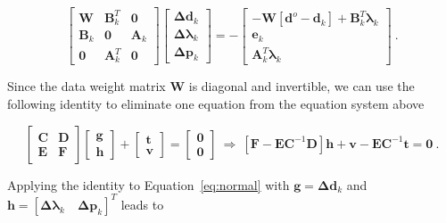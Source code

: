 \begin{equation}
    \begin{bmatrix}
      \mathbf{W} & \mathbf{B}_k^T & \mathbf{0} \\
      \mathbf{B}_k & \mathbf{0} & \mathbf{A}_k \\
      \mathbf{0} & \mathbf{A}_k^T & \mathbf{0}
    \end{bmatrix}
  \begin{bmatrix}
    \mathbf{\Delta d}_k \\
    \boldsymbol{\Delta\lambda}_k \\
    \mathbf{\Delta p}_k
  \end{bmatrix}
  = -
    \begin{bmatrix}
      -\mathbf{W}\left[\mathbf{d}^o - \mathbf{d}_k\right] + \mathbf{B}_k^T\boldsymbol{\lambda}_k
      \\
      \mathbf{e}_k
      \\
      \mathbf{A}_k^T\boldsymbol{\lambda}_k
    \end{bmatrix}
  \ .
  \label{eq:normal}
\end{equation}

Since the data weight matrix $\mathbf{W}$ is diagonal and invertible, we can
use the following identity to eliminate one equation from the equation system
above \citep{WellsKrakiwsky1971}

\begin{equation}
    \begin{bmatrix}
      \mathbf{C} & \mathbf{D} \\
      \mathbf{E} & \mathbf{F}
    \end{bmatrix}
    \begin{bmatrix}
      \mathbf{g} \\
      \mathbf{h}
    \end{bmatrix}
    +
    \begin{bmatrix}
      \mathbf{t}
      \\
      \mathbf{v}
    \end{bmatrix}
    =
    \begin{bmatrix}
      \mathbf{0}
      \\
      \mathbf{0}
    \end{bmatrix}
    \ \Rightarrow \
    \left[\mathbf{F} - \mathbf{E}\mathbf{C}^{-1}\mathbf{D}\right]\mathbf{h}
    + \mathbf{v} - \mathbf{E}\mathbf{C}^{-1}\mathbf{t} = \mathbf{0}
  \ .
  \label{eq:identity}
\end{equation}

Applying the identity to Equation~\ref{eq:normal} with
$\mathbf{g} = \mathbf{\Delta d}_k$ and
$\mathbf{h} = \left[\boldsymbol{\Delta\lambda}_k \quad \mathbf{\Delta p}_k\right]^T$
leads to

